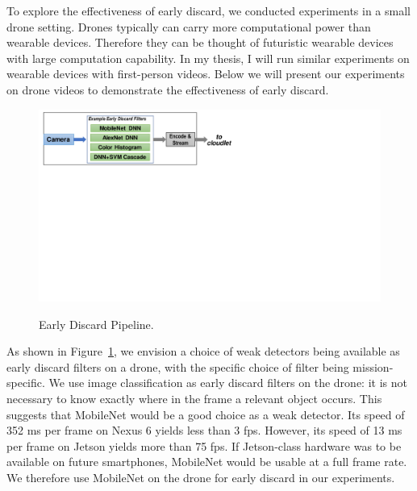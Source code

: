 To explore the effectiveness of early discard, we conducted experiments in a
small drone setting. Drones typically can carry more computational power than
wearable devices. Therefore they can be thought of futuristic wearable devices
with large computation capability. In my thesis, I will run similar experiments
on wearable devices with first-person videos. Below we will present our
experiments on drone videos to demonstrate the effectiveness of early discard.

\begin{figure}
\includegraphics[scale=0.8,trim={0 13.5cm 10cm 0},clip]{FIGS/fig-early-discard.pdf}\\
\caption{Early Discard Pipeline.}
\label{fig:ondrone}
\vspace{-0.2in}
\end{figure}


As shown in Figure~\ref{fig:ondrone}, we envision a choice of weak detectors
being available as early discard filters on a drone, with the specific choice of
filter being mission-specific. We use image classification as early discard
filters on the drone: it is not necessary to know exactly where in the frame a
relevant object occurs. This suggests that MobileNet would be a good choice as a
weak detector. Its speed of 352 ms per frame on Nexus 6 yields less than 3 fps.
However, its speed of 13 ms per frame on Jetson yields more than 75 fps. If
Jetson-class hardware was to be available on future smartphones, MobileNet
would be usable at a full frame rate. We therefore use MobileNet on the drone for
early discard in our experiments.

